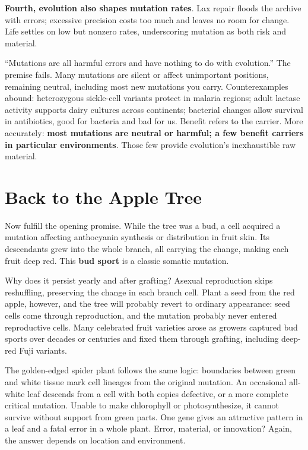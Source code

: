 \textbf{Fourth, evolution also shapes mutation rates}. Lax repair floods the archive with errors; excessive precision costs too much and leaves no room for change. Life settles on low but nonzero rates, underscoring mutation as both risk and material.

\begin{wuqu}
``Mutations are all harmful errors and have nothing to do with evolution.'' The premise fails. Many mutations are silent or affect unimportant positions, remaining neutral, including most new mutations you carry. Counterexamples abound: heterozygous sickle-cell variants protect in malaria regions; adult lactase activity supports dairy cultures across continents; bacterial changes allow survival in antibiotics, good for bacteria and bad for us. Benefit refers to the carrier. More accurately: \textbf{most mutations are neutral or harmful; a few benefit carriers in particular environments}. Those few provide evolution's inexhaustible raw material.
\end{wuqu}

\section{Back to the Apple Tree}

Now fulfill the opening promise. While the tree was a bud, a cell acquired a mutation affecting anthocyanin synthesis or distribution in fruit skin. Its descendants grew into the whole branch, all carrying the change, making each fruit deep red. This \textbf{bud sport} is a classic somatic mutation.

Why does it persist yearly and after grafting? Asexual reproduction skips reshuffling, preserving the change in each branch cell. Plant a seed from the red apple, however, and the tree will probably revert to ordinary appearance: seed cells come through reproduction, and the mutation probably never entered reproductive cells. Many celebrated fruit varieties arose as growers captured bud sports over decades or centuries and fixed them through grafting, including deep-red Fuji variants.

The golden-edged spider plant follows the same logic: boundaries between green and white tissue mark cell lineages from the original mutation. An occasional all-white leaf descends from a cell with both copies defective, or a more complete critical mutation. Unable to make chlorophyll or photosynthesize, it cannot survive without support from green parts. One gene gives an attractive pattern in a leaf and a fatal error in a whole plant. Error, material, or innovation? Again, the answer depends on location and environment.

